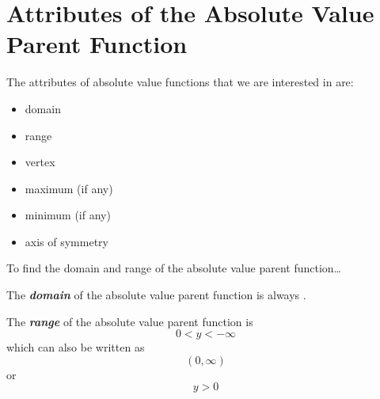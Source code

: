 
\section*{Attributes of the Absolute Value Parent Function}

The attributes of absolute value functions that we are interested in are:
\begin{itemize}[itemsep=0.1\baselineskip]
    \item domain
    \item range
    \item vertex
    \item maximum (if any)
    \item minimum (if any)
    \item axis of symmetry
\end{itemize}




\begin{myConceptSteps}{
        To find the 
        domain and range 
        of the absolute value parent function\dots
    }
\end{myConceptSteps}



\begin{center}
    \begin{tcolorbox}[width=4in]
        The {\bfseries\itshape domain} of the absolute value parent function 
        is always .
    \end{tcolorbox}
\end{center}



\begin{center}
    \begin{tcolorbox}[width=4in]
        The {\bfseries\itshape range} of the absolute value parent function 
        is 
        \[0 < y < -\infty \]
        which can also be written as
        \[(0,\infty)\]
        or
        \[y>0\]
    \end{tcolorbox}
\end{center}



